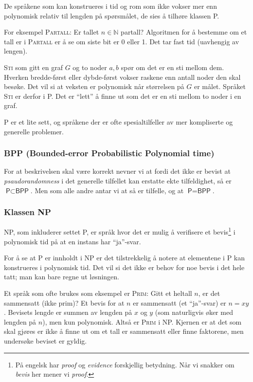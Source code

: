 \documentclass[a4paper, parskip=half]{scrartcl}
\theoremstyle{definition}
\begin{document}
De språkene som kan konstrueres i tid og rom som ikke vokser mer enn
polynomisk relativ til lengden på spørsmålet, de sies å tilhøre
klassen \textsf{P}.

For eksempel \textsc{Partall}:  Er tallet $n \in \mathbb{N}$ partall?
Algoritmen for å bestemme om et tall er i \textsc{Partall} er å se om
siste bit er 0 eller 1.  Det tar fast tid (uavhengig av lengen).

\textsc{Sti} som gitt en
graf $G$ og to noder $a,b$ spør om det er en sti mellom dem.
Hverken bredde-først eller dybde-først vokser raskene enn antall noder
den skal besøke.  Det vil si at veksten er polynomisk når størrelsen
på $G$ er målet.  Språket \textsc{Sti} er derfor i \textsf{P}.  Det er
``lett'' å finne ut som det er en sti mellom to noder i en graf.

\textsf{P} er et lite sett, og språkene der er ofte spesialtilfeller
av mer kompliserte og generelle problemer.


%
%
\subsubsection{\textsf{BPP} (Bounded-error Probabilistic Polynomial
  time)}
For at beskrivelsen skal være korrekt nevner vi at fordi det ikke er
bevist at \textsl{psaudorandomness} i det generelle tilfellet kan
erstatte ekte tilfeldighet, så er $\textsf{P} \subset \textsf{BPP}$.
Men som alle andre antar vi at så er tilfelle, og at $\textsf{P} =
\textsf{BPP}$.

%
%
\subsubsection{Klassen NP}

\textsf{NP}, som inkluderer settet \textsf{P}, er språk hvor det er
mulig å verifisere et bevis\footnote{På engelsk har \emph{proof} og
\emph{evidence} 
forskjellig betydning.  Når vi snakker om \emph{bevis} her mener vi
\emph{proof}.} i polynomisk tid på at en instans har ``ja''-svar.

For å se at \textsf{P} er innholdt i \textsf{NP} er det tilstrekkelig
å notere at  elementene i \textsf{P} kan konstrueres i polynomisk
tid.  Det vil si det ikke er behov for noe bevis i det hele tatt; man
kan bare regne ut løsningen.

Et språk som ofte brukes som eksempel er \textsc{Prim}: Gitt et
heltall $n$, er det sammensatt (ikke prim)?
Et bevis for at $n$ er sammensatt (et ``ja''-svar) er $n=xy$.
Bevisets lengde er summen av lengden på $x$ og $y$ (som naturligvis
øker med lengden på $n$), men kun polynomisk.  Altså er
\textsc{Prim} i \textsf{NP}.  Kjernen er at det som skal gjøres er
ikke å finne ut om et tall er sammensatt eller finne faktorene, men
undersøke beviset er gyldig.
\end{document}
